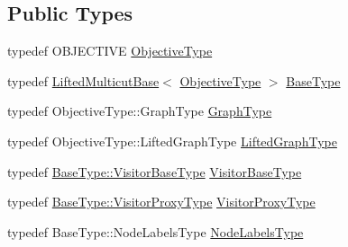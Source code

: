 \subsection*{Public Types}
\begin{DoxyCompactItemize}
\item 
typedef O\+B\+J\+E\+C\+T\+I\+V\+E \hyperlink{classnifty_1_1graph_1_1lifted__multicut_1_1LiftedMulticutAndresGreedyAdditive_aad174abbd547a6779d21b2707261ce91}{Objective\+Type}
\item 
typedef \hyperlink{classnifty_1_1graph_1_1lifted__multicut_1_1LiftedMulticutBase}{Lifted\+Multicut\+Base}$<$ \hyperlink{classnifty_1_1graph_1_1lifted__multicut_1_1LiftedMulticutAndresGreedyAdditive_aad174abbd547a6779d21b2707261ce91}{Objective\+Type} $>$ \hyperlink{classnifty_1_1graph_1_1lifted__multicut_1_1LiftedMulticutAndresGreedyAdditive_aa4c70e93e8f23fe886884c5d33b94206}{Base\+Type}
\item 
typedef Objective\+Type\+::\+Graph\+Type \hyperlink{classnifty_1_1graph_1_1lifted__multicut_1_1LiftedMulticutAndresGreedyAdditive_acf401a359a97d354dbfc446f2123c71e}{Graph\+Type}
\item 
typedef Objective\+Type\+::\+Lifted\+Graph\+Type \hyperlink{classnifty_1_1graph_1_1lifted__multicut_1_1LiftedMulticutAndresGreedyAdditive_ab3559e4bd06a256ffce401e8d35d64bc}{Lifted\+Graph\+Type}
\item 
typedef \hyperlink{classnifty_1_1graph_1_1optimization_1_1common_1_1SolverBase_a5a14d64c70a9cc0eebc7d71d2b089f9b}{Base\+Type\+::\+Visitor\+Base\+Type} \hyperlink{classnifty_1_1graph_1_1lifted__multicut_1_1LiftedMulticutAndresGreedyAdditive_a4531913f0d3f10d228ee28cb983f668c}{Visitor\+Base\+Type}
\item 
typedef \hyperlink{classnifty_1_1graph_1_1optimization_1_1common_1_1SolverBase_a58913ea9ab9232ff72608b710c1012d0}{Base\+Type\+::\+Visitor\+Proxy\+Type} \hyperlink{classnifty_1_1graph_1_1lifted__multicut_1_1LiftedMulticutAndresGreedyAdditive_aa365becac68b1dea378e889f964b80d8}{Visitor\+Proxy\+Type}
\item 
typedef Base\+Type\+::\+Node\+Labels\+Type \hyperlink{classnifty_1_1graph_1_1lifted__multicut_1_1LiftedMulticutAndresGreedyAdditive_a43804693812be2e174e03525c85cd513}{Node\+Labels\+Type}
\end{DoxyCompactItemize}
